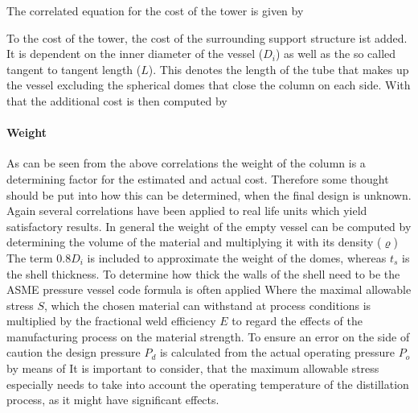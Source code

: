			The correlated equation for the cost of the tower is given by
			
			To the cost of the tower, the cost of the surrounding support structure ist added. It is dependent
			on the inner diameter of the vessel ($D_i$) as well as the so called tangent to tangent length ($L$).
			This denotes the length of the tube that makes up the vessel excluding the spherical domes that
			close the column on each side. With that the additional cost is then computed by
			
		\paragraph{Weight}
			As can be seen from the above correlations the weight of the column is a determining factor
			for the estimated and actual cost. Therefore some thought should be put into how this can
			be determined, when the final design is unknown. Again several correlations have been applied
			to real life units which yield satisfactory results. In general the weight of the empty vessel
			can be computed by determining the volume of the material and multiplying it with its density ($\varrho$)
			The term $0.8 D_i$ is included to approximate the weight of the domes, whereas $t_s$ is the shell
			thickness. To determine how thick the walls of the shell need to be the ASME pressure vessel code
			formula is often applied
			Where the maximal allowable stress $S$, which the chosen material can withstand at
			process conditions is multiplied by the fractional weld efficiency $E$ to regard the effects
			of the manufacturing process on the material strength. To ensure an error on the side of
			caution the design pressure $P_d$ is calculated from the actual operating pressure $P_o$
			by means of
			It is important to consider, that the maximum allowable stress especially needs to take into account
			the operating temperature of the distillation process, as it might have significant effects.
			
